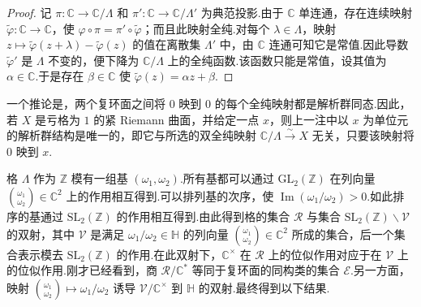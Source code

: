 \begin{proof}

记 $\pi:\mathbb C\longrightarrow\mathbb C/\Lambda$ 和 $\pi':\mathbb C\longrightarrow\mathbb C/\Lambda'$ 为典范投影.由于 $\mathbb C$ 单连通，存在连续映射 $\widetilde\varphi:\mathbb C\longrightarrow\mathbb C$，使 $\varphi\circ\pi=\pi'\circ\widetilde\varphi$；而且此映射全纯.对每个 $\lambda\in\Lambda$，映射 $z\mapsto\widetilde\varphi(z+\lambda)-\widetilde\varphi(z)$ 的值在离散集 $\Lambda'$ 中，由 $\mathbb C$ 连通可知它是常值.因此导数 $\widetilde\varphi'$ 是 $\Lambda$ 不变的，便下降为 $\mathbb C/\Lambda$ 上的全纯函数.该函数只能是常值，设其值为 $\alpha\in\mathbb C$.于是存在 $\beta\in\mathbb C$ 使 $\widetilde\varphi(z)=\alpha z+\beta$.

\end{proof}

\begin{remark*}

一个推论是，两个复环面之间将 $0$ 映到 $0$ 的每个全纯映射都是解析群同态.因此，若 $X$ 是亏格为 $1$ 的紧 Riemann 曲面，并给定一点 $x$，则上一注中以 $x$ 为单位元的解析群结构是唯一的，即它与所选的双全纯映射 $\mathbb C/\Lambda\xrightarrow\sim X$ 无关，只要该映射将 $0$ 映到 $x$.

\end{remark*}

格 $\Lambda$ 作为 $\mathbb Z$ 模有一组基 $(\omega_1,\omega_2)$.所有基都可以通过 $\mathrm{GL}_2(\mathbb Z)$ 在列向量 $\binom{\omega_1}{\omega_2}\in\mathbb C^2$ 上的作用相互得到.可以排列基的次序，使 $\operatorname{Im}(\omega_1/\omega_2)>0$.如此排序的基通过 $\mathrm{SL}_2(\mathbb Z)$ 的作用相互得到.由此得到格的集合 $\mathcal R$ 与集合 $\mathrm{SL}_2(\mathbb Z)\backslash\mathcal V$ 的双射，其中 $\mathcal V$ 是满足 $\omega_1/\omega_2\in\mathbb H$ 的列向量 $\binom{\omega_1}{\omega_2}\in\mathbb C^2$ 所成的集合，后一个集合表示模去 $\mathrm{SL}_2(\mathbb Z)$ 的作用.在此双射下，$\mathbb C^\times$ 在 $\mathcal R$ 上的位似作用对应于在 $\mathcal V$ 上的位似作用.刚才已经看到，商 $\mathcal R/\mathbb C^*$ 等同于复环面的同构类的集合 $\mathcal E$.另一方面，映射 $\binom{\omega_1}{\omega_2}\mapsto\omega_1/\omega_2$ 诱导 $\mathcal V/\mathbb C^\times$ 到 $\mathbb H$ 的双射.最终得到以下结果.

